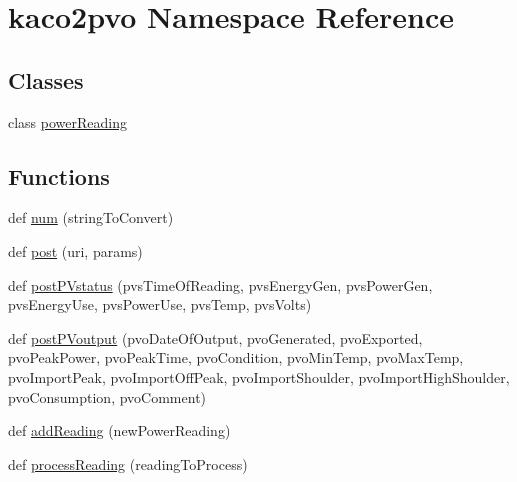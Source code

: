 \hypertarget{namespacekaco2pvo}{}\section{kaco2pvo Namespace Reference}
\label{namespacekaco2pvo}
\subsection*{Classes}
\begin{DoxyCompactItemize}
\item 
class \hyperlink{classkaco2pvo_1_1power_reading}{power\+Reading}
\end{DoxyCompactItemize}
\subsection*{Functions}
\begin{DoxyCompactItemize}
\item 
def \hyperlink{namespacekaco2pvo_ad19eafdfa1ef0861d4b6fc39db613d75}{num} (string\+To\+Convert)
\item 
def \hyperlink{namespacekaco2pvo_a9db95957b3864a612d3081599c2f44dc}{post} (uri, params)
\item 
def \hyperlink{namespacekaco2pvo_a87f1220a1e7465a5c1ec0ce45bdbb65c}{post\+P\+Vstatus} (pvs\+Time\+Of\+Reading, pvs\+Energy\+Gen, pvs\+Power\+Gen, pvs\+Energy\+Use, pvs\+Power\+Use, pvs\+Temp, pvs\+Volts)
\item 
def \hyperlink{namespacekaco2pvo_a7a6ad473616ad2d5a48336378e93ae1e}{post\+P\+Voutput} (pvo\+Date\+Of\+Output, pvo\+Generated, pvo\+Exported, pvo\+Peak\+Power, pvo\+Peak\+Time, pvo\+Condition, pvo\+Min\+Temp, pvo\+Max\+Temp, pvo\+Import\+Peak, pvo\+Import\+Off\+Peak, pvo\+Import\+Shoulder, pvo\+Import\+High\+Shoulder, pvo\+Consumption, pvo\+Comment)
\item 
def \hyperlink{namespacekaco2pvo_a7bfbcaef67b7f421a4963d361a3c5b70}{add\+Reading} (new\+Power\+Reading)
\item 
def \hyperlink{namespacekaco2pvo_a181001898db5bbb63325ef1d1aceb723}{process\+Reading} (reading\+To\+Process)
\end{DoxyCompactItemize}
